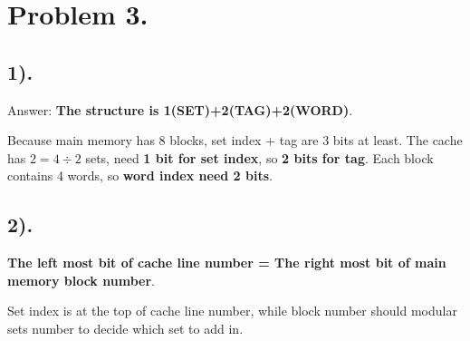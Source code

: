 \documentclass[11pt]{article}  %
\begin{document}
\section*{Problem 3.}

\subsection*{1). }

Answer: \textbf{The structure is 1(SET)+2(TAG)+2(WORD)}.

Because main memory has 8 blocks, set index + tag are 3 bits at least. The cache has $2 = 4\div 2$ sets, need \textbf{1 bit for set index}, 
so \textbf{2 bits for tag}. Each block contains 4 words, so \textbf{word index need 2 bits}.


\subsection*{2). }

\textbf{The left most bit of cache line number = The right most bit of main memory block number}.

Set index is at the top of cache line number, while block number should modular sets number to decide which set to add in.
\end{document}
